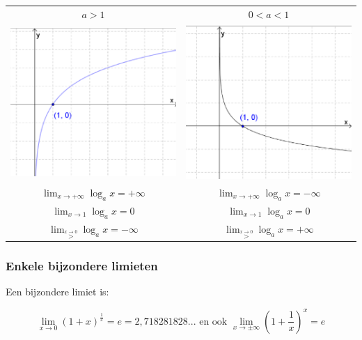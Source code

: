 \begin{tabel*}{}
	\centering
	\begin{tabular}{c|c}
		$a>1$ & $0<a<1$\\
		\includegraphics[width=7cm]{2_elem_rekenvaardigheden_B/inputs/logagroter1.eps} & \includegraphics[width=7cm]{2_elem_rekenvaardigheden_B/inputs/logakleiner1}\\
		${\displaystyle \lim_{x\to+\infty}}\log_{a}x=+\infty$ & ${\displaystyle \lim_{x\to+\infty}}\log_{a}x=-\infty$\\
		${\displaystyle \lim_{x\to1}}\log_{a}x=0$ & ${\displaystyle \lim_{x\to1}}\log_{a}x=0$\\
		${\displaystyle \lim_{\overset{x\rightarrow0}{>}}}\log_{a}x=-\infty$ & ${\displaystyle \lim_{\overset{x\rightarrow0}{>}}}\log_{a}x=+\infty$\\
	\end{tabular}
\end{tabel*}

\subsubsection{Enkele bijzondere limieten}
\label{sec:bijzlim}
Een bijzondere limiet is:

\begin{equation*}
\lim_{x\to0}\left(1+x\right)^{\frac{1}{x}}=e=2,718281828...
\text{ en ook } \lim_{x\to\pm\infty}\left(1+\frac{1}{x}\right)^{x}=e
\end{equation*}

